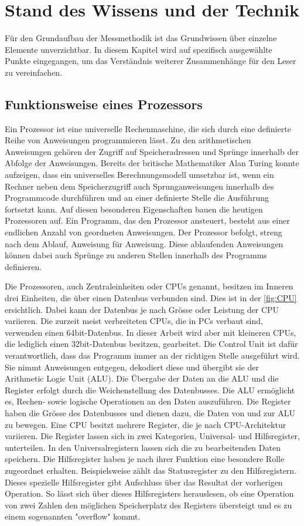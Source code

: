 \chapter{Stand des Wissens und der Technik}
Für den Grundaufbau der Messmethodik ist das Grundwissen über einzelne Elemente unverzichtbar. In diesem Kapitel wird auf spezifisch ausgewählte Punkte eingegangen, um das Verständnis weiterer Zusammenhänge für den Leser zu vereinfachen.


\section{Funktionsweise eines Prozessors}

Ein Prozessor ist eine universelle Rechenmaschine, die sich durch eine definierte Reihe von Anweisungen programmieren lässt. Zu den arithmetischen Anweisungen gehören der Zugriff auf Speicheradressen und Sprünge innerhalb der Abfolge der Anweisungen.
Bereits der britische Mathematiker Alan Turing konnte aufzeigen, dass ein universelles Berechnungsmodell umsetzbar ist, wenn ein Rechner neben dem Speicherzugriff auch Sprunganweisungen innerhalb des Programmcode durchführen und an einer definierte Stelle die Ausführung fortsetzt kann\cite{Hoffmann2014l}. Auf diesen besonderen Eigenschaften bauen die heutigen Prozessoren auf. Ein Programm, das den Prozessor ansteuert, besteht aus einer endlichen Anzahl von geordneten Anweisungen. Der Prozessor befolgt, streng nach dem Ablauf, Anweisung für Anweisung. Diese ablaufenden Anweisungen können dabei auch Sprünge zu anderen Stellen innerhalb des Programms definieren.
\par
Die Prozessoren, auch Zentraleinheiten oder CPUs genannt, besitzen im Inneren drei Einheiten, die über einen Datenbus verbunden sind. Dies ist in der \autoref{fig:CPU} ersichtlich. Dabei kann der Datenbus je nach Grösse oder Leistung der CPU variieren. Die zurzeit meist verbreiteten CPUs, die in PCs verbaut sind, verwenden einen 64bit-Datenbus. In dieser Arbeit wird aber mit kleineren CPUs, die lediglich einen 32bit-Datenbus besitzen, gearbeitet. Die Control Unit\cite{patterson2013computer} ist dafür verantwortlich, dass das Programm immer an der richtigen Stelle ausgeführt wird. Sie nimmt Anweisungen entgegen, dekodiert diese und übergibt sie der Arithmetic Logic Unit (ALU). Die Übergabe der Daten an die ALU und die Register erfolgt durch die Weichenstellung des Datenbusses. Die ALU ermöglicht es, Rechen- sowie logische Operationen an den Daten auszuführen. Die Register haben die Grösse des Datenbusses und dienen dazu, die Daten von und zur ALU zu bewegen. Eine CPU besitzt mehrere Register, die je nach CPU-Architektur variieren. Die Register lassen sich in zwei Kategorien, Universal- und Hilfsregister, unterteilen. In den Universalregistern lassen sich die zu bearbeitenden Daten speichern. Die Hilfsregister haben je nach ihrer Funktion eine besondere Rolle zugeordnet erhalten. Beispielsweise zählt das Statusregister zu den Hilfsregistern. Dieses spezielle Hilfsregister gibt Aufschluss über das Resultat der vorherigen Operation. So lässt sich über dieses Hilfsregisters herauslesen, ob eine Operation von zwei Zahlen den möglichen Speicherplatz des Registers übersteigt und es zu einem sogenannten "overflow" kommt.
